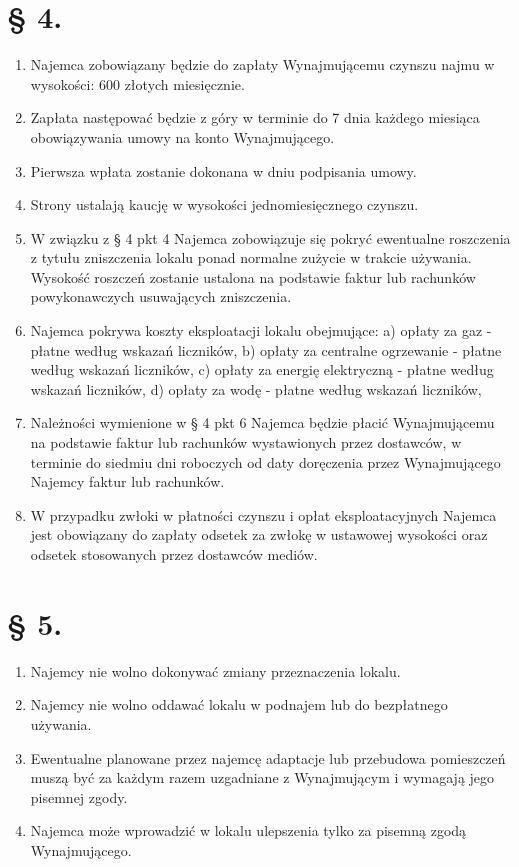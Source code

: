 \documentclass[a4paper,11pt, notitlepage]{article}
\begin{document}
\section*{§ 4.}
    \begin{enumerate}
        \item Najemca zobowiązany będzie do zapłaty Wynajmującemu czynszu najmu w wysokości:
600 złotych miesięcznie.
        \item Zapłata następować będzie z góry w terminie do 7 dnia każdego miesiąca obowiązywania umowy na konto Wynajmującego.
        \item Pierwsza wpłata zostanie dokonana w dniu podpisania umowy.
        \item Strony ustalają kaucję w wysokości jednomiesięcznego czynszu.
        \item W związku z § 4 pkt 4 Najemca zobowiązuje się pokryć ewentualne roszczenia z tytułu zniszczenia lokalu ponad normalne zużycie w trakcie używania. Wysokość roszczeń zostanie ustalona na podstawie faktur lub rachunków powykonawczych usuwających zniszczenia.
 	    \item Najemca pokrywa koszty eksploatacji lokalu obejmujące:
            \subitem a) opłaty za gaz - płatne według wskazań liczników,
            \subitem b) opłaty za centralne ogrzewanie - płatne według wskazań liczników,
            \subitem c) opłaty za energię elektryczną - płatne według wskazań liczników,
            \subitem d) opłaty za wodę - płatne według wskazań liczników,
        \item Należności wymienione w § 4 pkt 6 Najemca będzie płacić 	Wynajmującemu na podstawie faktur lub rachunków wystawionych przez dostawców, w terminie do siedmiu dni roboczych od daty doręczenia przez Wynajmującego Najemcy faktur lub rachunków.
        \item W przypadku zwłoki w płatności czynszu i opłat eksploatacyjnych Najemca jest obowiązany do zapłaty odsetek za zwłokę w ustawowej wysokości oraz odsetek stosowanych przez dostawców mediów.
    \end{enumerate}
\section*{§ 5.}
    \begin{enumerate}
        \item Najemcy nie wolno dokonywać zmiany przeznaczenia lokalu.
        \item Najemcy nie wolno oddawać lokalu w podnajem lub do bezpłatnego używania.
        \item Ewentualne planowane przez najemcę adaptacje lub przebudowa pomieszczeń muszą 	być za każdym razem uzgadniane z Wynajmującym i wymagają jego 	pisemnej zgody.
        \item Najemca może wprowadzić w lokalu ulepszenia tylko za pisemną zgodą Wynajmującego.
    \end{enumerate}
\end{document}
